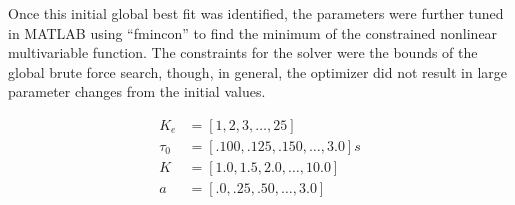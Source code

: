 Once this initial global best fit was identified, the parameters were further tuned in MATLAB using ``fmincon'' to find the minimum of the constrained nonlinear multivariable function.
The constraints for the solver were the bounds of the global brute force search, though, in general, the optimizer did not result in large parameter changes from the initial values.

\begin{align}
    K_e    & = [1, 2, 3, \ldots, 25]             \\
    \tau_0 & = [.100, .125, .150, \ldots, 3.0] s \\
    K      & = [1.0, 1.5, 2.0, \ldots, 10.0]     \\
    a      & = [.0, .25, .50, \ldots, 3.0]
\end{align}

